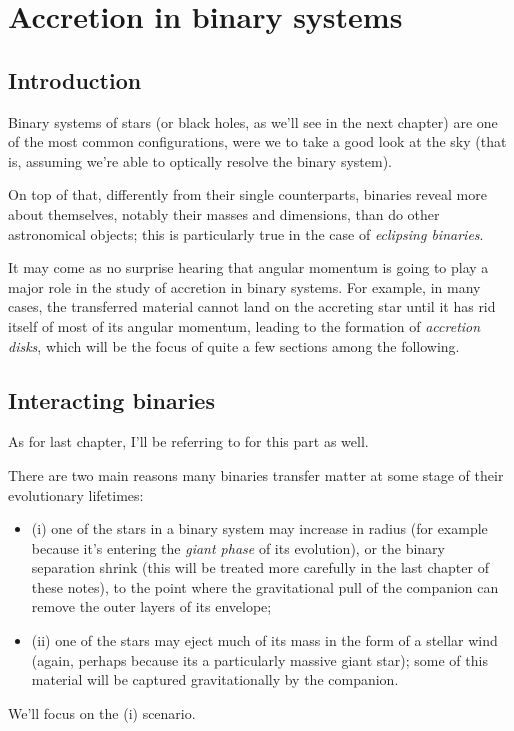 \chapter{Accretion in binary systems} \label{ch:vii}
\section{Introduction}
Binary systems of stars (or black holes, as we'll see in the next chapter) are one of the most common configurations, were we to take a good look at the sky (that is, assuming we're able to optically resolve the binary system).
\par On top of that, differently from their single counterparts, binaries reveal more about themselves, notably their masses and dimensions, than do other astronomical objects; this is particularly true in the case of \emph{eclipsing binaries}.
\par It may come as no surprise hearing that angular momentum is going to play a major role in the study of accretion in binary systems. For example, in many cases, the transferred material cannot land on the accreting star until it has rid itself of most of its angular momentum, leading to the formation of \emph{accretion disks}, which will be the focus of quite a few sections among the following.
\section{Interacting binaries}
As for last chapter, I'll be referring to \cite{Frank_King_Raine_2002} for this part as well.
\par There are two main reasons many binaries transfer matter at some stage of their
evolutionary lifetimes:
\begin{itemize}
    \item (i) one of the stars in a binary system may increase in radius (for example because it's entering the \emph{giant phase} of its evolution), or the binary separation shrink (this will be treated more carefully in the last chapter of these notes), to the point where the gravitational pull of the companion can remove the outer layers of its envelope;
    \item (ii) one of the stars may eject much of its mass in the form of a stellar wind (again, perhaps because its a particularly massive giant star); some of this material will be captured gravitationally by the companion.
\end{itemize}
We'll focus on the (i) scenario.
